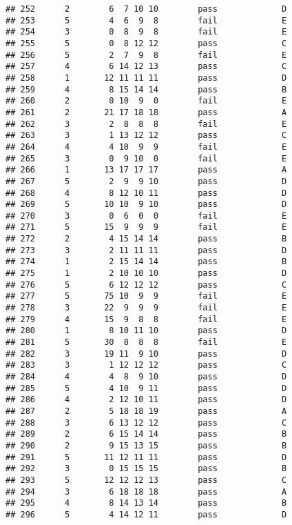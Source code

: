 \documentclass[
]{article}
\begin{document}
\begin{verbatim}
## 252      2        6  7 10 10        pass             D
## 253      5        4  6  9  8        fail             E
## 254      3        0  8  9  8        fail             E
## 255      5        0  8 12 12        pass             C
## 256      5        2  7  9  8        fail             E
## 257      4        6 14 12 13        pass             C
## 258      1       12 11 11 11        pass             D
## 259      4        8 15 14 14        pass             B
## 260      2        0 10  9  0        fail             E
## 261      2       21 17 18 18        pass             A
## 262      3        2  8  8  8        fail             E
## 263      3        1 13 12 12        pass             C
## 264      4        4 10  9  9        fail             E
## 265      3        0  9 10  0        fail             E
## 266      1       13 17 17 17        pass             A
## 267      5        2  9  9 10        pass             D
## 268      4        8 12 10 11        pass             D
## 269      5       10 10  9 10        pass             D
## 270      3        0  6  0  0        fail             E
## 271      5       15  9  9  9        fail             E
## 272      2        4 15 14 14        pass             B
## 273      3        2 11 11 11        pass             D
## 274      1        2 15 14 14        pass             B
## 275      1        2 10 10 10        pass             D
## 276      5        6 12 12 12        pass             C
## 277      5       75 10  9  9        fail             E
## 278      3       22  9  9  9        fail             E
## 279      4       15  9  8  8        fail             E
## 280      1        8 10 11 10        pass             D
## 281      5       30  8  8  8        fail             E
## 282      3       19 11  9 10        pass             D
## 283      3        1 12 12 12        pass             C
## 284      4        4  8  9 10        pass             D
## 285      5        4 10  9 11        pass             D
## 286      4        2 12 10 11        pass             D
## 287      2        5 18 18 19        pass             A
## 288      3        6 13 12 12        pass             C
## 289      2        6 15 14 14        pass             B
## 290      2        9 15 13 15        pass             B
## 291      5       11 12 11 11        pass             D
## 292      3        0 15 15 15        pass             B
## 293      5       12 12 12 13        pass             C
## 294      3        6 18 18 18        pass             A
## 295      4        8 14 13 14        pass             B
## 296      5        4 14 12 11        pass             D

\end{verbatim}
\end{document}
